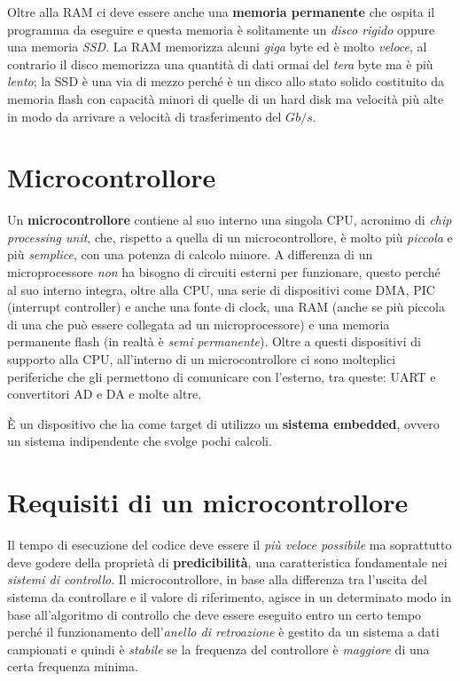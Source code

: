 \documentclass[12pt, a4paper]{report}
\begin{document}
Oltre alla RAM ci deve essere anche una \textbf{memoria permanente} che ospita il programma da eseguire e questa memoria è solitamente un \textit{disco rigido} oppure una memoria \textit{SSD}. La RAM memorizza alcuni \textit{giga} byte ed è molto \textit{veloce}, al contrario il disco memorizza una quantità di dati ormai del \textit{tera} byte ma è più \textit{lento}; la SSD è una via di mezzo perché è un disco allo stato solido costituito da memoria flash con capacità minori di quelle di un hard disk ma velocità più alte in modo da arrivare a velocità di trasferimento del $Gb/s$.

\section{Microcontrollore}
Un \textbf{microcontrollore} contiene al suo interno una singola CPU, acronimo di \textit{chip processing unit}, che, rispetto a quella di un microcontrollore, è molto più \textit{piccola} e più \textit{semplice}, con una potenza di calcolo minore. A differenza di un microprocessore \textit{non} ha bisogno di circuiti esterni per funzionare, questo perché al suo interno integra, oltre alla CPU, una serie di dispositivi come DMA, PIC (interrupt controller) e anche una fonte di clock, una RAM (anche se più piccola di una che può essere collegata ad un microprocessore) e una memoria permanente flash (in realtà è \textit{semi permanente}). Oltre a questi dispositivi di supporto alla CPU, all'interno di un microcontrollore ci sono molteplici periferiche che gli permettono di comunicare con l'esterno, tra queste: UART e convertitori AD e DA e molte altre.

È un dispositivo che ha come target di utilizzo un \textbf{sistema embedded}, ovvero un sistema indipendente che svolge pochi calcoli.

\section{Requisiti di un microcontrollore}
Il tempo di esecuzione del codice deve essere il \textit{più veloce possibile} ma soprattutto deve godere della proprietà di \textbf{predicibilità}, una caratteristica fondamentale nei \textit{sistemi di controllo}. Il microcontrollore, in base alla differenza tra l'uscita del sistema da controllare e il valore di riferimento, agisce in un determinato modo in base all'algoritmo di controllo che deve essere eseguito entro un certo tempo perché il funzionamento dell'\textit{anello di retroazione} è gestito da un sistema a dati campionati e quindi è \textit{stabile} se la frequenza del controllore è \textit{maggiore} di una certa frequenza minima.
\end{document}
